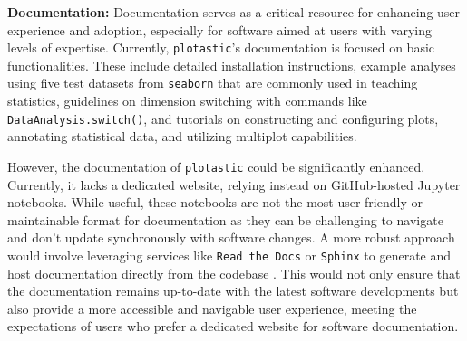 \textbf{Documentation:}
Documentation serves as a critical resource for enhancing user experience and
adoption, especially for software aimed at users with varying levels of
expertise. Currently, \texttt{plotastic}'s documentation is focused on basic
functionalities. These include detailed installation instructions, example
analyses using five test datasets from \texttt{seaborn} that are commonly used
in teaching statistics, guidelines on dimension switching with commands like
\texttt{DataAnalysis.switch()}, and tutorials on constructing and configuring
plots, annotating statistical data, and utilizing multiplot capabilities.

However, the documentation of \texttt{plotastic} could be significantly
enhanced. Currently, it lacks a dedicated website, relying instead on
GitHub-hosted Jupyter notebooks. While useful, these notebooks are not the most
user-friendly or maintainable format for documentation as they can be
challenging to navigate and don't update synchronously with software changes. A
more robust approach would involve leveraging services like \texttt{Read the Docs}
or \texttt{Sphinx} to generate and host documentation directly from the codebase
\cite{ReadDocs2024, Sphinx2024}. This would not only ensure
that the documentation remains up-to-date with the latest software developments
but also provide a more accessible and navigable user experience, meeting the
expectations of users who prefer a dedicated website for software documentation.



